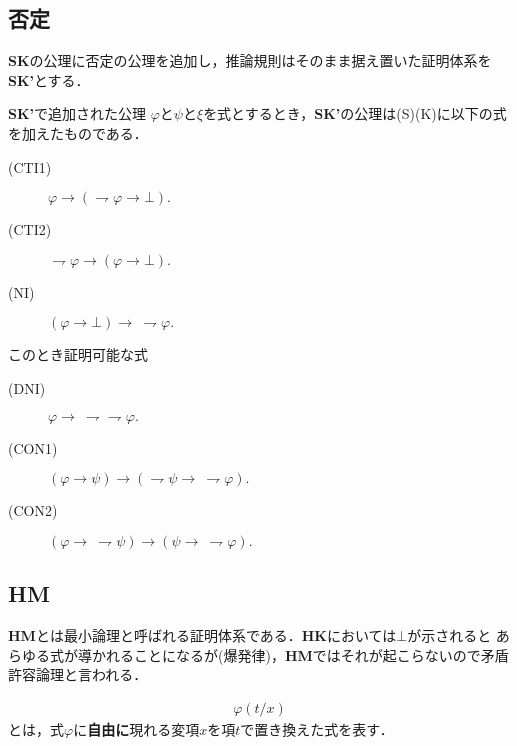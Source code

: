 \subsection{否定}
	{\bf SK}の公理に否定の公理を追加し，推論規則はそのまま据え置いた証明体系を{\bf SK'}とする．
	
	\begin{itembox}[l]{{\bf SK'}で追加された公理}
		$\varphi$と$\psi$と$\xi$を式とするとき，{\bf SK'}の公理は(S)(K)に以下の式を加えたものである．
		\begin{description}
			\item[(CTI1)] $\varphi \rightarrow (\rightharpoondown \varphi \rightarrow \bot).$
			
			\item[(CTI2)] $\rightharpoondown \varphi \rightarrow (\varphi \rightarrow \bot).$
			
			\item[(NI)] $(\varphi \rightarrow \bot) \rightarrow\ \rightharpoondown \varphi.$
		\end{description}
	\end{itembox}
	
	このとき証明可能な式
	\begin{description}
		\item[(DNI)] $\varphi \rightarrow\ \rightharpoondown \rightharpoondown \varphi.$
		\item[(CON1)] $(\varphi \rightarrow \psi) \rightarrow (\rightharpoondown \psi \rightarrow\ \rightharpoondown \varphi).$
		\item[(CON2)] $(\varphi \rightarrow\ \rightharpoondown \psi) \rightarrow (\psi \rightarrow\ \rightharpoondown \varphi).$
	\end{description}
	
\subsection{{\bf HM}}
	{\bf HM}とは最小論理と呼ばれる証明体系である．{\bf HK}においては$\bot$が示されると
	あらゆる式が導かれることになるが(爆発律)，{\bf HM}ではそれが起こらないので矛盾許容論理と言われる．
	
	\begin{align}
		\varphi(t/x)
	\end{align}
	とは，式$\varphi$に{\bf 自由に}現れる変項$x$を項$t$で置き換えた式を表す．
	
